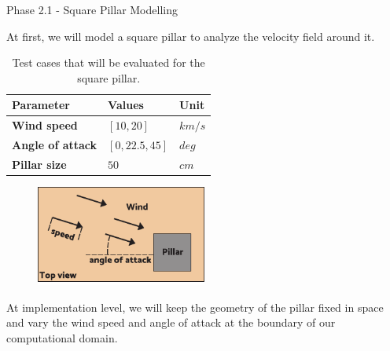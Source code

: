 \begin{frame}{Phase 2.1 - Square Pillar Modelling}

    At first, we will model a square pillar to analyze the velocity field around it.

    \begin{table}
        \centering
        \begin{tabular}{l|ll}
            Parameter                & Values          & Unit   \\
            \hline
            \textbf{Wind speed}      & $[10, 20]$      & $km/s$ \\
            \textbf{Angle of attack} & $[0, 22.5, 45]$ & $deg$  \\
            \textbf{Pillar size}     & $50$            & $cm$   \\
            \hline
        \end{tabular}
        \caption{Test cases that will be evaluated for the square pillar.}
    \end{table}

    \begin{figure}
        \centering
        \includegraphics[width=0.5\textwidth]{pdf/Square-pillar.pdf}
    \end{figure}

    At implementation level, we will keep the geometry of the pillar fixed in space and vary the wind speed and angle of attack at the boundary of our computational domain.

\end{frame}



